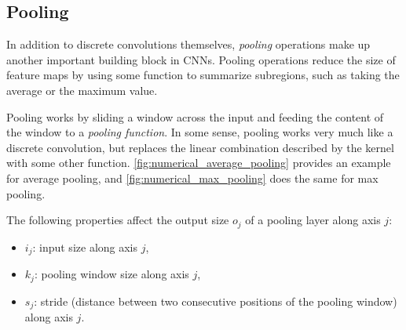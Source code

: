 \subsection{Pooling}

In addition to discrete convolutions themselves, {\em pooling\/} operations
make up another important building block in CNNs. Pooling operations reduce
the size of feature maps by using some function to summarize subregions, such
as taking the average or the maximum value.

Pooling works by sliding a window across the input and feeding the content of
the window to a {\em pooling function}. In some sense, pooling works very much
like a discrete convolution, but replaces the linear combination described by
the kernel with some other function. \autoref{fig:numerical_average_pooling}
provides an example for average pooling, and \autoref{fig:numerical_max_pooling}
does the same for max pooling.

The following properties affect the output size $o_j$ of a pooling layer
along axis $j$:

\begin{itemize}
    \item $i_j$: input size along axis $j$,
    \item $k_j$: pooling window size along axis $j$,
    \item $s_j$: stride (distance between two consecutive positions of the
        pooling window) along axis $j$.
\end{itemize}

